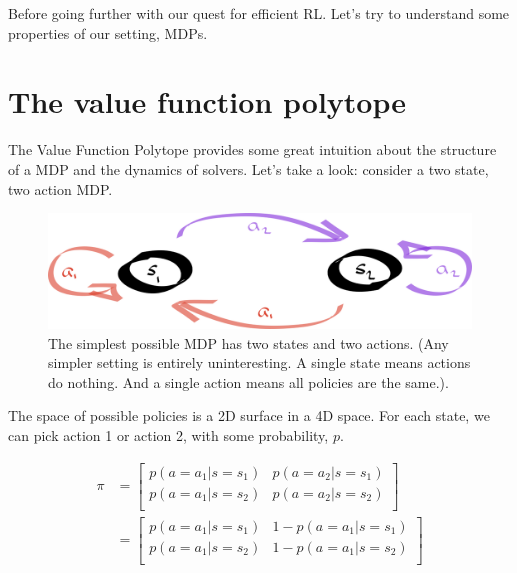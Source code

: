 
\newpage

Before going further with our quest for efficient RL. Let's try to understand
some properties of our setting, MDPs.


\section{The value function polytope}

The Value Function Polytope \cite{Dadashi2018} provides some great intuition
about the structure of a MDP and the dynamics of solvers. Let's take a look:
consider a two state, two action MDP.

\begin{figure}[hb!]
\centering
\includegraphics[width=1\textwidth,height=0.25\textheight]{../../pictures/drawings/2-state-automata.png}
\caption{The simplest possible MDP has two states and two actions. (Any simpler setting is entirely uninteresting. A single state means actions do nothing.
And a single action means all policies are the same.).}
\end{figure}

The space of possible policies is a 2D surface in a 4D space. For each state, we
can pick action 1 or action 2, with some probability, $p$.

\begin{align}
\pi &=
\begin{bmatrix}
  p(a=a_1|s=s_1) & p(a=a_2|s=s_1) \\
  p(a=a_1|s=s_2) & p(a=a_2|s=s_2)\\
\end{bmatrix} \\
&=
\begin{bmatrix}
p(a=a_1|s=s_1) & 1-p(a=a_1|s=s_1) \\
p(a=a_1|s=s_2) & 1-p(a=a_1|s=s_2)\\
\end{bmatrix}
\end{align}

